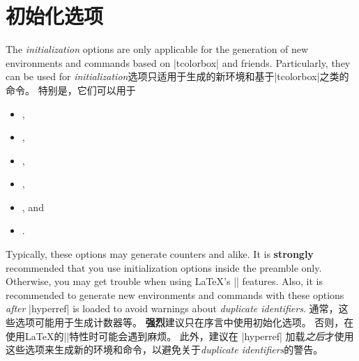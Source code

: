 
\section{初始化选项}\label{sec:initkeys}%
%
\begin{stripedbox}
The \emph{initialization} options are only applicable for the generation
of new environments and commands based on |tcolorbox| and friends.
Particularly, they can be used for
\tcblower
\emph{initialization}选项只适用于生成的新环境和基于|tcolorbox|之类的命令。%
特别是，它们可以用于
\end{stripedbox}

\begin{itemize}
\item{},
\item{},
\item{},
\item{},
\item{}, and
\item{}.
\end{itemize}

\bigskip
\begin{marker}
\begin{stripedbox}[blank]
Typically, these options may generate counters and alike.
It is \textbf{strongly} recommended that you use initialization options inside the preamble only. 
Otherwise, you may get trouble when using \LaTeX's || features.
Also, it is recommended to generate new environments and commands with these
options \emph{after} |hyperref| is loaded to avoid warnings about \emph{duplicate identifiers}.
\tcblower
通常，这些选项可能用于生成计数器等。%
\textbf{强烈}建议只在序言中使用初始化选项。%
否则，在使用\LaTeX 的||特性时可能会遇到麻烦。
此外，建议在 |hyperref| 加载\emph{之后}才使用这些选项来生成新的环境和命令，以避免关于\emph{duplicate identifiers}的警告。
\end{stripedbox}
\end{marker}


